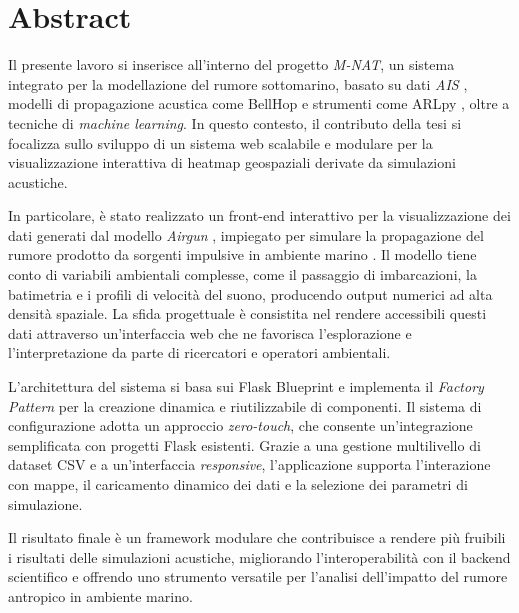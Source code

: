 \chapter*{Abstract}

\vspace{1em}

\noindent
Il presente lavoro si inserisce all'interno del progetto \textit{M-NAT}, un sistema
integrato per la modellazione del rumore sottomarino, basato su dati \textit{AIS}
\cite{ais-wikipedia}, modelli di propagazione acustica come BellHop
\cite{bellhop-doc} e strumenti come ARLpy \cite{arlpy-bellhop}, oltre a tecniche
di \textit{machine learning}. In questo contesto, il contributo della tesi si
focalizza sullo sviluppo di un sistema web scalabile e modulare per la
visualizzazione interattiva di heatmap geospaziali derivate da simulazioni
acustiche.

\vspace{0.5em}

\noindent
In particolare, è stato realizzato un front-end interattivo per la
visualizzazione dei dati generati dal modello \textit{Airgun} \cite{airgun-dosits},
impiegato per simulare la propagazione del rumore prodotto da sorgenti impulsive
in ambiente marino \cite{seismic-source}. Il modello tiene conto di variabili ambientali
complesse, come il passaggio di imbarcazioni, la batimetria e i profili di velocità
del suono, producendo output numerici ad alta densità spaziale. La sfida progettuale
è consistita nel rendere accessibili questi dati attraverso un'interfaccia web che
ne favorisca l'esplorazione e l'interpretazione da parte di ricercatori e operatori
ambientali.

\vspace{0.5em}

\noindent
L'architettura del sistema si basa sui Flask Blueprint e implementa il \textit{Factory
Pattern} per la creazione dinamica e riutilizzabile di componenti. Il sistema di
configurazione adotta un approccio \textit{zero-touch}, che consente un'integrazione
semplificata con progetti Flask esistenti. Grazie a una gestione multilivello di
dataset CSV e a un'interfaccia \textit{responsive}, l'applicazione supporta l'interazione
con mappe, il caricamento dinamico dei dati e la selezione dei parametri di
simulazione.

\vspace{0.5em}

\noindent
Il risultato finale è un framework modulare che contribuisce a rendere più fruibili
i risultati delle simulazioni acustiche, migliorando l'interoperabilità con il
backend scientifico e offrendo uno strumento versatile per l'analisi dell'impatto
del rumore antropico in ambiente marino.
